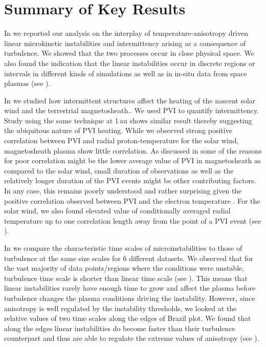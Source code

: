     \section{Summary of Key Results} \label{sec:summ9}

        In  we reported our analysis on the interplay of temperature-anisotropy
        driven linear microkinetic instabilities and intermittency arising as a consequence of
        turbulence. We showed that the two processes occur in close physical space. We also found
        the indication that the linear instabilities occur in discrete regions or intervals in
        different kinds of simulations as well as in in-situ data from space plasmas (see
        ).

        In  we studied how intermittent structures affect the heating of the
        nascent solar wind and the terrestrial magnetosheath.. We used PVI to quantify
        intermittency. Study \citep{Osman2012a} using the same technique at 1\,au shows similar
        result thereby suggesting the ubiquitous nature of PVI heating. While we observed strong
        positive correlation between PVI and radial proton-temperature for the solar wind,
        magnetosheath plasma show little correlation. As discussed in  some of the
        reasons for poor correlation might be the lower average value of PVI in magnetosheath as
        compared to the solar wind, small duration of observations as well as the relatively longer
        duration of the PVI events might be other contributing factors. In any case, this remains
        poorly understood and rather surprising given the positive correlation observed between PVI
        and the electron temperature \citep{Chasapis2018}. For the solar wind, we also found
        elevated value of conditionally averaged radial temperature up to one correlation length
        away from the point of a PVI event (see ).

        In  we compare the characteristic time scales of microinstabilities to
        those of turbulence at the same size scales for 6 different datasets. We observed that for
        the vast majority of data points/regions where the conditions were unstable, turbulence time
        scale is shorter than linear time scale (see
        ). This means that linear instabilities
        rarely have enough time to grow and affect the plasma before turbulence changes the plasma
        conditions driving the instability. However, since anisotropy is well regulated by the
        instability thresholds, we looked at the relative values of two time scales along the edges
        of Brazil plot. We found that along the edges linear instabilities do become faster than
        their turbulence counterpart and thus are able to regulate the extreme values of anisotropy
        (see ).

